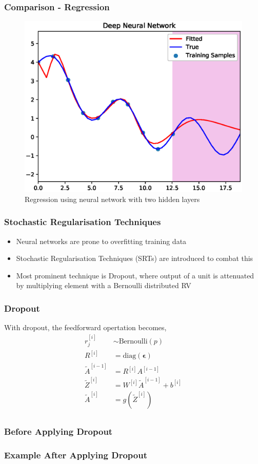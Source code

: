 \documentclass{beamer}
\newcommand{\mb}[1]{\mathbf{#1}}
\begin{document}
\begin{frame}
  \frametitle{Comparison - Regression}
  \vspace*{-0.15cm}
  \begin{figure}[!h]
    \centering
    \includegraphics[width=0.8\linewidth]{./figs/nn.eps}
    \caption{Regression using neural network with two hidden layers}
    \label{fig:nn}
  \end{figure}
\end{frame}
% 
% 
% 
% 
\begin{frame}
  \frametitle{Stochastic Regularisation Techniques}
  \begin{itemize}
  \item Neural networks are prone to overfitting training data
  \item Stochastic Regularisation Techniques (SRTs) are introduced to combat this
  \item Most prominent technique is Dropout, where output of a unit is attenuated by multiplying element with a Bernoulli distributed RV \cite{sriv2014}
  \end{itemize}
\end{frame}
% 
% 
%
\begin{frame}
  \frametitle{Dropout}
  With dropout, the feedforward opertation becomes,
  \begin{align*}
    r_j^{[i]} & \sim \textrm{Bernoulli}(p)\\
    R^{[i]} &= \textrm{diag}(\mb{\epsilon})\\
    \widetilde{A}^{[i-1]} &= R^{[i]}A^{[i-1]} \\
    \widetilde{Z}^{[i]} &= W^{[i]}\widetilde{A}^{[i-1]} + b^{[i]}\\
    \widetilde{A}^{[i]} &= g(\widetilde{Z}^{[i]})\\
  \end{align*}    
\end{frame}
% 
% 
\begin{frame}
  \frametitle{Before Applying Dropout}
  
\end{frame}
% 
% 
% 
% 
\begin{frame}
  \frametitle{Example After Applying Dropout}
  
\end{frame}
% 
% 
% 
% 
\end{document}
